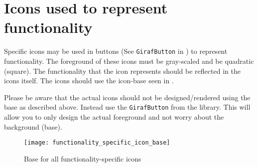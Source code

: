 \section{Icons used to represent functionality}
Specific icons may be used in buttons (See \texttt{GirafButton} in \gc) to represent functionality. The foreground of these icons must be gray-scaled and be quadratic (square). The functionality that the icon represents should be reflected in the icons itself. The icons should use the icon-base seen in .

\begin{note}
	Please be aware that the actual icons should not be designed/rendered using the base as described above. Instead use the \texttt{GirafButton} from the \gc library. This will allow you to only design the actual foreground and not worry about the background (base).
\end{note}

\begin{figure}[h]
	\centering
	\texttt{[image: functionality\_specific\_icon\_base]}
	\caption{Base for all functionality-specific icons}
	\label{fig:functionality_specific_icon_base}
\end{figure}

